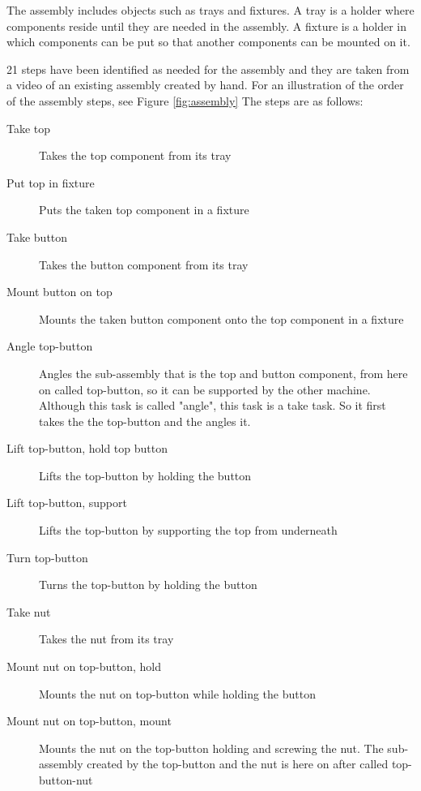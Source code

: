 The assembly includes objects such as trays and fixtures. A tray is a holder where components reside until they are needed in the assembly. A fixture is a holder in which components can be put so that another components can be mounted on it.

21 steps have been identified as needed for the assembly and they are taken from a video of an existing assembly created by hand. For an illustration of the order of the assembly steps, see Figure \ref{fig:assembly} The steps are as follows:

\begin{description}
\item[Take top] Takes the top component from its tray

\item[Put top in fixture] Puts the taken top component in a fixture

\item[Take button] Takes the button component from its tray

\item[Mount button on top] Mounts the taken button component onto the top component in a fixture

\item[Angle top-button] Angles the sub-assembly that is the top and button component, from here on called top-button, so it can be supported by the other machine. Although this task is called "angle", this task is a take task. So it first takes the the top-button and the angles it.

\item[Lift top-button, hold top button] Lifts the top-button by holding the button

\item[Lift top-button, support] Lifts the top-button by supporting the top from underneath

\item[Turn top-button] Turns the top-button by holding the button

\item[Take nut] Takes the nut from its tray

\item[Mount nut on top-button, hold] Mounts the nut on top-button while holding the button

\item[Mount nut on top-button, mount] Mounts the nut on the top-button holding and screwing the nut. The sub-assembly created by the top-button and the nut is here on after called top-button-nut


\end{description}
